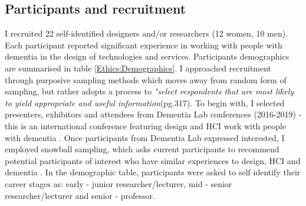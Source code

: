 \subsection{Participants and recruitment}
\label{Ethics:Participants}
I recruited 22 self-identified designers and/or researchers (12 women, 10 men). Each participant reported significant experience in working with people with dementia in the design of technologies and services. Participants demographics are summarised in table \ref{Ethics:Demographics}. I approached recruitment through purposive sampling methods which moves away from random form of sampling, but rather adopts a process to \textit{"select respondents that are most likely to yield appropriate and useful information}(pg.317)\citep{kelly2010qualitative}. To begin with, I selected presenters, exhibitors and attendees from Dementia Lab conferences (2016-2019) - this is an international conference featuring design and HCI work with people with dementia \citep{brankaert_dementia_2019}. Once participants from Dementia Lab expressed interested, I employed snowball sampling, which asks current participants to recommend potential participants of interest who have similar experiences to design, HCI and dementia \citep{noy_sampling_2008}. In the demographic table, participants were asked to self identify their career stages as: early - junior researcher/lecturer, mid - senior researcher/lecturer and senior - professor.

